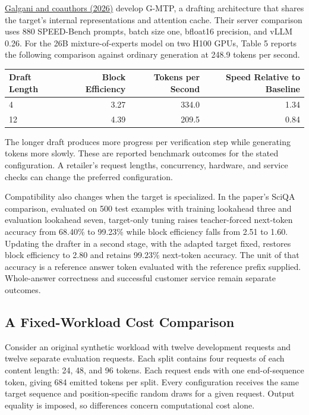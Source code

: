 \href{https://arxiv.org/abs/2611.25813v1}{Galgani and coauthors (2026)}
develop G-MTP, a drafting architecture that shares the target's internal
representations and attention cache. Their server comparison uses 880
SPEED-Bench prompts, batch size one, bfloat16 precision, and vLLM 0.26.
For the 26B mixture-of-experts model on two H100 GPUs, Table 5 reports
the following comparison against ordinary generation at 248.9 tokens per
second.

\begin{table}[H]
\centering\small
\begin{tabular}{@{}lrrr@{}}
\toprule
Draft Length & Block Efficiency & Tokens per Second & Speed Relative to
Baseline \\
\midrule

4 & 3.27 & 334.0 & 1.34 \\
12 & 4.39 & 209.5 & 0.84 \\
\bottomrule
\end{tabular}
\end{table}

The longer draft produces more progress per verification step while
generating tokens more slowly. These are reported benchmark outcomes for
the stated configuration. A retailer's request lengths, concurrency,
hardware, and service checks can change the preferred configuration.

Compatibility also changes when the target is specialized. In the
paper's SciQA comparison, evaluated on 500 test examples with training
lookahead three and evaluation lookahead seven, target-only tuning
raises teacher-forced next-token accuracy from 68.40\% to 99.23\% while
block efficiency falls from 2.51 to 1.60. Updating the drafter in a
second stage, with the adapted target fixed, restores block efficiency
to 2.80 and retains 99.23\% next-token accuracy. The unit of that
accuracy is a reference answer token evaluated with the reference prefix
supplied. Whole-answer correctness and successful customer service
remain separate outcomes.

\hypertarget{M07-a-fixed-workload-cost-comparison}{%
\subsection{A Fixed-Workload Cost
Comparison}\label{M07-a-fixed-workload-cost-comparison}}

\noindent \noindent Consider an original synthetic workload with twelve
development requests and twelve separate evaluation requests. Each split
contains four requests of each content length: 24, 48, and 96 tokens.
Each request ends with one end-of-sequence token, giving 684 emitted
tokens per split. Every configuration receives the same target sequence
and position-specific random draws for a given request. Output equality
is imposed, so differences concern computational cost alone.

